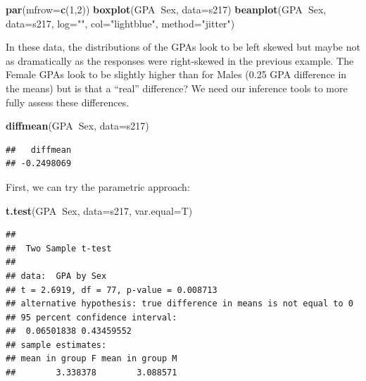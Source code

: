 \documentclass[]{book}
\newenvironment{Shaded}{\begin{snugshade}}{\end{snugshade}}
\newcommand{\KeywordTok}[1]{\textcolor[rgb]{0.13,0.29,0.53}{\textbf{#1}}}
\newcommand{\DataTypeTok}[1]{\textcolor[rgb]{0.13,0.29,0.53}{#1}}
\newcommand{\DecValTok}[1]{\textcolor[rgb]{0.00,0.00,0.81}{#1}}
\newcommand{\StringTok}[1]{\textcolor[rgb]{0.31,0.60,0.02}{#1}}
\newcommand{\OperatorTok}[1]{\textcolor[rgb]{0.81,0.36,0.00}{\textbf{#1}}}
\newcommand{\NormalTok}[1]{#1}
\theoremstyle{definition}
\theoremstyle{definition}
\theoremstyle{remark}
\begin{document}
\begin{Shaded}
\begin{Highlighting}[]
\KeywordTok{par}\NormalTok{(}\DataTypeTok{mfrow=}\KeywordTok{c}\NormalTok{(}\DecValTok{1}\NormalTok{,}\DecValTok{2}\NormalTok{))}
\KeywordTok{boxplot}\NormalTok{(GPA}\OperatorTok{~}\NormalTok{Sex, }\DataTypeTok{data=}\NormalTok{s217)}
\KeywordTok{beanplot}\NormalTok{(GPA}\OperatorTok{~}\NormalTok{Sex, }\DataTypeTok{data=}\NormalTok{s217, }\DataTypeTok{log=}\StringTok{""}\NormalTok{, }\DataTypeTok{col=}\StringTok{"lightblue"}\NormalTok{, }\DataTypeTok{method=}\StringTok{"jitter"}\NormalTok{)}
\end{Highlighting}
\end{Shaded}

In these data, the distributions of the GPAs look to be left skewed but
maybe not as dramatically as the responses were right-skewed in the
previous example. The Female GPAs look to be slightly higher than for
Males (0.25 GPA difference in the means) but is that a ``real''
difference? We need our inference tools to more fully assess these
differences.

\begin{Shaded}
\begin{Highlighting}[]
\KeywordTok{diffmean}\NormalTok{(GPA}\OperatorTok{~}\NormalTok{Sex, }\DataTypeTok{data=}\NormalTok{s217)}
\end{Highlighting}
\end{Shaded}

\begin{verbatim}
##   diffmean 
## -0.2498069
\end{verbatim}

First, we can try the parametric approach:

\begin{Shaded}
\begin{Highlighting}[]
\KeywordTok{t.test}\NormalTok{(GPA}\OperatorTok{~}\NormalTok{Sex, }\DataTypeTok{data=}\NormalTok{s217, }\DataTypeTok{var.equal=}\NormalTok{T)}
\end{Highlighting}
\end{Shaded}

\begin{verbatim}
## 
##  Two Sample t-test
## 
## data:  GPA by Sex
## t = 2.6919, df = 77, p-value = 0.008713
## alternative hypothesis: true difference in means is not equal to 0
## 95 percent confidence interval:
##  0.06501838 0.43459552
## sample estimates:
## mean in group F mean in group M 
##        3.338378        3.088571
\end{verbatim}
\end{document}
